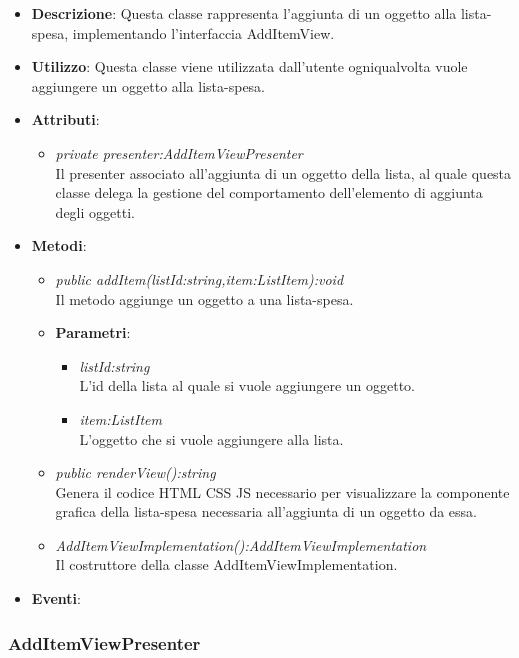\begin{itemize}
\item \textbf{Descrizione}: Questa classe rappresenta l'aggiunta di un oggetto alla lista-spesa, implementando l'interfaccia AddItemView.
\item \textbf{Utilizzo}: Questa classe viene utilizzata dall'utente ogniqualvolta vuole aggiungere un oggetto alla lista-spesa.
\item \textbf{Attributi}: 
	\begin{itemize}
	\item \textit{private presenter:AddItemViewPresenter}\\
	Il presenter associato all'aggiunta di un oggetto della lista, al quale questa classe delega la gestione del comportamento dell'elemento di aggiunta degli oggetti.
	\end{itemize}
\item \textbf{Metodi}:
	\begin{itemize}
	\item \textit{public addItem(listId:string,item:ListItem):void}\\
	Il metodo aggiunge un oggetto a una lista-spesa.
			\item{\textbf{Parametri}: \begin{itemize}
			\item \textit{listId:string}\\
			L'id della lista al quale si vuole aggiungere un oggetto.
			\item \textit{item:ListItem}\\
			L'oggetto che si vuole aggiungere alla lista.
			\end{itemize}}
	\item \textit{public renderView():string}\\
	Genera il codice HTML CSS JS necessario per visualizzare la componente grafica della lista-spesa necessaria all'aggiunta di un oggetto da essa.
	\item \textit{AddItemViewImplementation():AddItemViewImplementation}\\
	Il costruttore della classe AddItemViewImplementation.
	\end{itemize}
\item \textbf{Eventi}:
\end{itemize}

\subsubsection{AddItemViewPresenter}

